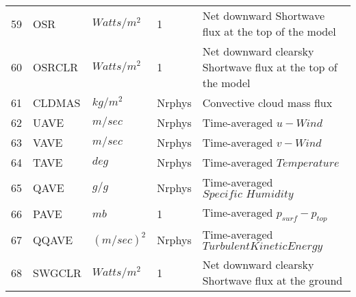 \begin{tabular}{lllll}
59 & OSR      &   $Watts/m^2$  &    1 
         &\begin{minipage}[t]{3in}
          {Net downward Shortwave flux at the top of the model}
         \end{minipage}\\
60 & OSRCLR   &   $Watts/m^2$  &    1  
         &\begin{minipage}[t]{3in}
          {Net downward clearsky Shortwave flux at the top of the model}
         \end{minipage}\\
61 & CLDMAS   &   $kg / m^2$  &    Nrphys
         &\begin{minipage}[t]{3in}
          {Convective cloud mass flux}
         \end{minipage}\\
62 & UAVE     &   $m/sec$  &    Nrphys
         &\begin{minipage}[t]{3in}
          {Time-averaged $u-Wind$}
         \end{minipage}\\
63 & VAVE     &   $m/sec$  &    Nrphys
         &\begin{minipage}[t]{3in}
          {Time-averaged $v-Wind$}
         \end{minipage}\\
64 & TAVE     &   $deg$  &    Nrphys
         &\begin{minipage}[t]{3in}
          {Time-averaged $Temperature$}
         \end{minipage}\\
65 & QAVE     &   $g/g$  &    Nrphys
         &\begin{minipage}[t]{3in}
          {Time-averaged $Specific \, \, Humidity$}
         \end{minipage}\\
66 & PAVE     &   $mb$  &    1
         &\begin{minipage}[t]{3in}
          {Time-averaged $p_{surf} - p_{top}$}
         \end{minipage}\\
67 & QQAVE    &   $(m/sec)^2$  &    Nrphys
         &\begin{minipage}[t]{3in}
          {Time-averaged $Turbulent Kinetic Energy$}
         \end{minipage}\\
68 & SWGCLR   &   $Watts/m^2$  &    1  
         &\begin{minipage}[t]{3in}
          {Net downward clearsky Shortwave flux at the ground} 
         \end{minipage}\\

\end{tabular}
